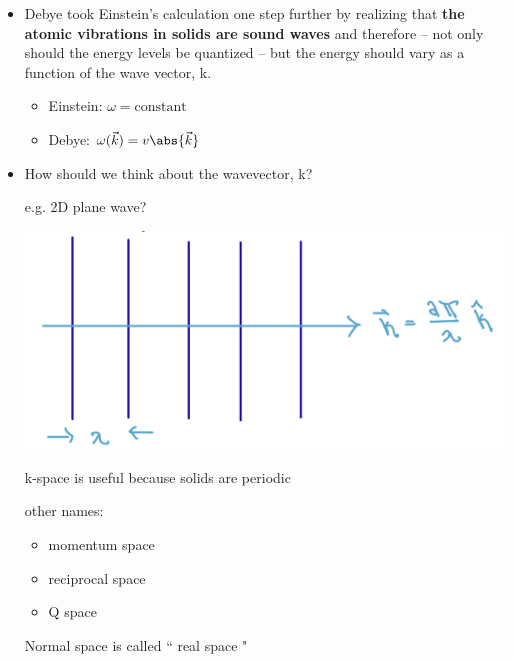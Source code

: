 \begin{itemize}
    \item Debye took Einstein's calculation one step further by realizing that \textbf{the atomic vibrations in solids are sound waves} and therefore -- not only should the energy levels be quantized -- but the energy should vary as a function of the wave vector, k.

    \begin{itemize}
        \item Einstein: $\omega=\text{constant}$
        \item Debye: $\omega(\vec{k}) = v \abs{\vec{k}}$
    \end{itemize}

    \item How should we think about the wavevector, k?

    e.g. 2D plane wave?

    \begin{center}
        \includegraphics[width = 0.5 \linewidth]{Images/wavevector-k.png}
    \end{center}        

    k-space is useful because solids are periodic

    other names:

    \begin{itemize}
        \item momentum space 
        \item reciprocal space
        \item Q space
    \end{itemize}

    Normal space is called `` real space " 

\end{itemize}

